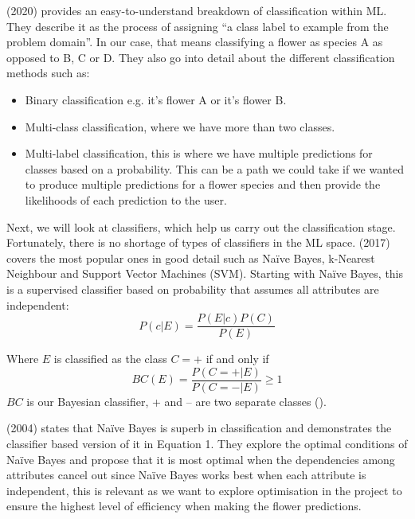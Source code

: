 \documentclass{article}
\begin{document}
\citeauthor{brownlee2020} (2020) provides an easy-to-understand breakdown of classification within ML. They describe it 
as the process of assigning “a class label to example from the problem domain”. In our case, that means classifying a 
flower as species A as opposed to B, C or D. They also go into detail about the different classification methods such 
as:
\begin{itemize}
    \item Binary classification e.g. it's flower A or it's flower B.
    \item Multi-class classification, where we have more than two classes.
    \item Multi-label classification, this is where we have multiple predictions for classes based on a probability. 
    This can be a path we could take if we wanted to produce multiple predictions for a flower species and then provide 
    the likelihoods of each prediction to the user.
\end{itemize}
Next, we will look at classifiers, which help us carry out the classification stage. Fortunately, there is no shortage 
of types of classifiers in the ML space. \citeauthor{MohammedMohssen2017Ml:a} (2017) covers the most popular ones in 
good detail such as Naïve Bayes, k-Nearest Neighbour and Support Vector Machines (SVM). Starting with Naïve Bayes, this 
is a supervised classifier based on probability that assumes all attributes are independent:
\begin{equation}
P(c|E) = \frac{P(E|c)P(C)}{P(E)}
\end{equation}

Where \(E\) is classified as the class \(C = +\) if and only if
\[BC(E) = \frac{P(C = +|E)}{P(C = -|E)} \geq 1\]
\(BC\) is our Bayesian classifier, + and – are two separate classes (\cite{zhang2004optimality}).

\par

\citeauthor{zhang2004optimality} (2004) states that Naïve Bayes is superb in classification and demonstrates the
classifier based version of it in Equation 1. They explore the optimal conditions of Naïve Bayes and propose
that it is most optimal when the dependencies among attributes cancel out since Naïve Bayes works best when each 
attribute is independent, this is relevant as we want to explore optimisation in the project to ensure the highest 
level of efficiency when making the flower predictions.

\par
\end{document}
